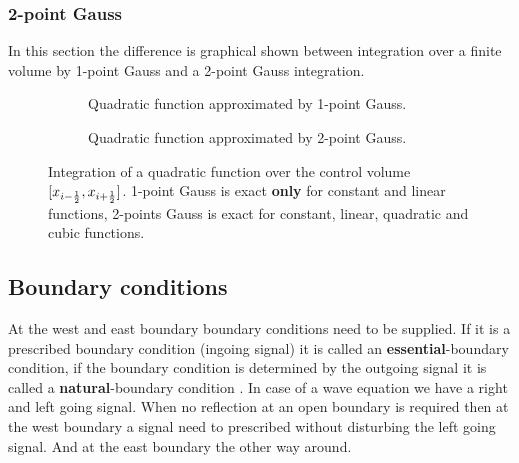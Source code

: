 \subsubsection{2-point Gauss}\label{sec:2_point_gauss}
In this section the difference is graphical shown between integration over a finite volume by  1-point Gauss and a 2-point Gauss integration.
\begin{figure}[H]
    \begin{subfigure}{0.475\textwidth}
       \begin{center}
        \def\svgwidth{1.2\textwidth} %
        \end{center}
    \caption{Quadratic function approximated by 1-point Gauss.} \label{fig:1d_integration_1points_gauss}
    \end{subfigure}
\hfill
    \begin{subfigure}{0.475\textwidth}
    \begin{center}
        \def\svgwidth{1.2\textwidth} %
    \end{center}
    \caption{Quadratic function approximated by 2-point Gauss.} \label{fig:1d_integration_2points_gauss}
    \end{subfigure}
    \caption[Illustration of the 1-point and 2-point Gauss integration method of a quadratic function.]{Integration of a quadratic function over the control volume  $[x_{i-\frac{1}{2}}, x_{i+\frac{1}{2}}]$. 1-point Gauss is exact \textbf{only} for constant and linear functions, 2-points Gauss is exact for constant, linear, quadratic and cubic functions.} \label{fig:1d_integration}
\end{figure}

\subsection{Boundary conditions}\label{sec:boundary_conditions}
At the west and east boundary boundary conditions need to be supplied.
If it is a prescribed boundary condition (ingoing signal) it is called an \textbf{essential}-boundary condition, if the boundary condition is determined by the outgoing signal it is called a \textbf{natural}-boundary condition \citep{Logan1987,VanKanEtAL2008}.
In case of a wave equation we have a right and left going signal.
When no reflection at an open boundary is required then at the west boundary a signal need to prescribed  without disturbing the left going signal.
And at the east boundary the other way around.

